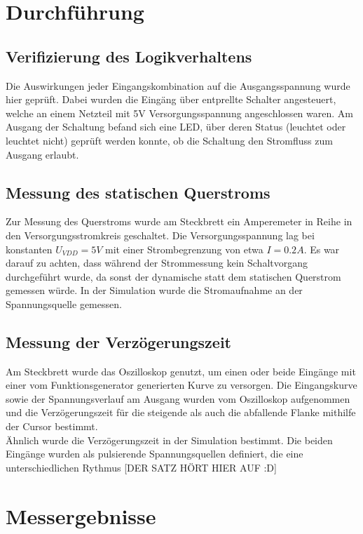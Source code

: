 \documentclass[11pt, a4paper]{article}
\begin{document}
\section*{Durchführung}

\subsection*{Verifizierung des Logikverhaltens}

Die Auswirkungen jeder Eingangskombination auf die Ausgangsspannung wurde hier geprüft. Dabei wurden die Eingäng über entprellte Schalter angesteuert, welche an einem Netzteil mit 5V Versorgungsspannung angeschlossen waren. Am Ausgang der Schaltung befand sich eine LED, über deren Status (leuchtet oder leuchtet nicht) geprüft werden konnte, ob die Schaltung den Stromfluss zum Ausgang erlaubt. 

\subsection*{Messung des statischen Querstroms}

Zur Messung des Querstroms wurde am Steckbrett ein Amperemeter in Reihe in den Versorgungsstromkreis geschaltet.
Die Versorgungsspannung lag bei konstanten $U_{VDD} = 5V$ mit einer Strombegrenzung von etwa $I = 0.2A$. Es war darauf zu achten, dass während der Strommessung kein Schaltvorgang durchgeführt wurde, da sonst der dynamische statt dem statischen Querstrom gemessen würde.
In der Simulation wurde die Stromaufnahme an der Spannungsquelle gemessen. 

\subsection*{Messung der Verzögerungszeit}

Am Steckbrett wurde das Oszilloskop genutzt, um einen oder beide Eingänge mit einer vom Funktionsgenerator generierten Kurve zu versorgen. Die Eingangskurve sowie der Spannungsverlauf am Ausgang wurden vom Oszilloskop aufgenommen und die Verzögerungszeit für die steigende als auch die abfallende Flanke mithilfe der Cursor bestimmt. \\

Ähnlich wurde die Verzögerungszeit in der Simulation bestimmt. Die beiden Eingänge wurden als pulsierende Spannungsquellen definiert, die eine unterschiedlichen Rythmus [DER SATZ HÖRT HIER AUF :D]

\section*{Messergebnisse}
\end{document}
